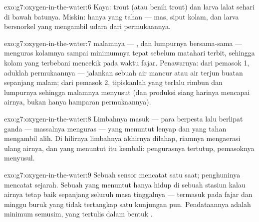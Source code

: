 \begin{solution}{exo:g7:oxygen-in-the-water:6}
Kaya:  trout (atau benih  trout) dan larva lalat sehari di
bawah batunya. Miskin: hanya  yang tahan ---  mas, siput
kolam, dan larva bersnorkel yang mengambil udara dari permukaannya.
\end{solution}

\begin{solution}{exo:g7:oxygen-in-the-water:7}
 malamnya --- ,  dan  lumpurnya
bersama-sama --- menguras kolamnya sampai minimumnya tepat sebelum
matahari terbit, sehingga kolam yang terbebani mencekik  pada
waktu fajar. Penawarnya: dari pemasok 1, aduklah permukaannya ---
jalankan sebuah air mancur atau air terjun buatan sepanjang malam;
dari pemasok 2, tipiskanlah  yang terlalu rimbun dan
lumpurnya sehingga  malamnya menyusut (dan produksi siang
harinya mencapai airnya, bukan hanya hamparan permukaannya).
\end{solution}

\begin{solution}{exo:g7:oxygen-in-the-water:8}
Limbahnya masuk --- para  berpesta lalu berlipat ganda ---
 massalnya menguras  ---  yang menuntut
lenyap dan yang tahan mengambil alih. Di hilirnya limbahnya akhirnya
dilahap, riamnya mengaerasi ulang airnya, dan  yang menuntut
itu kembali: pengurasnya tertutup, pemasoknya menyusul.
\end{solution}

\begin{solution}{exo:g7:oxygen-in-the-water:9}
Sebuah sensor mencatat satu saat; penghuninya mencatat sejarah. Sebuah
 yang menuntut hanya hidup di sebuah stasiun kalau airnya tetap
baik sepanjang seluruh masa tinggalnya --- termasuk pada fajar dan
minggu buruk yang tidak tertangkap satu kunjungan pun. Pendataannya
adalah minimum semusim, yang tertulis dalam bentuk .
\end{solution}

